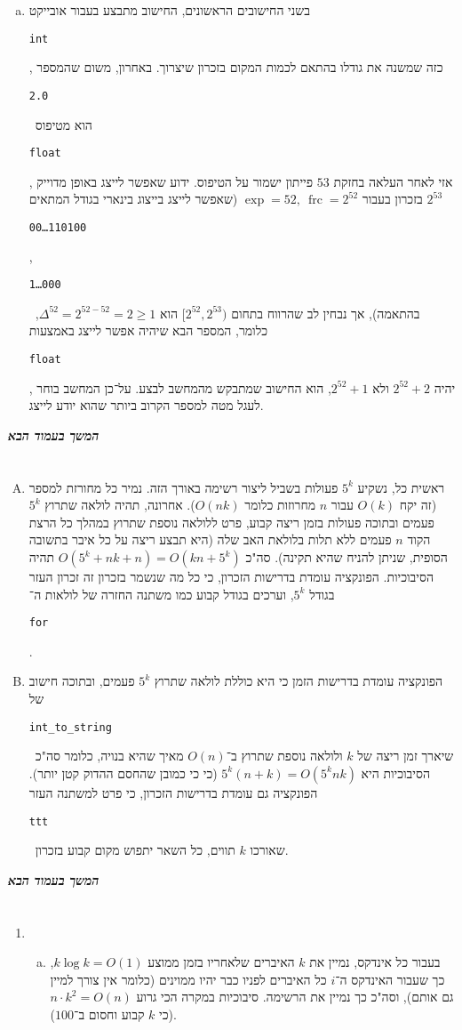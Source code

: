 \documentclass[]{article}
\makeatletter
\newcommand\en[1] {\begin{otherlanguage}{english}#1\end{otherlanguage}}
\newcommand\ttt[1]{\en{\footnotesize\texttt{#1}\normalsize}}
\newcommand\npage {\vfil {\hfil \textbf{\textit{המשך בעמוד הבא}}} \hfil \vfil \pagebreak}
\newcommand{\skipitems}[1]{
	\addtocounter{\@enumctr}{#1}
}
\DeclareMathOperator{\frc}   {frc}
\makeatother
\begin{document}
\begin{enumerate}[A)]
\begin{enumerate}[a.]
				\item בשני החישובים הראשונים, החישוב מתבצע בעבור אובייקט \ttt{int}, כזה שמשנה את גודלו בהתאם לכמות המקום בזכרון שיצרוך. באחרון, משום שהמספר \ttt{2.0} \ הוא מטיפוס \ttt{float}, אזי לאחר העלאה בחזקת $53$ פייתון ישמור על הטיפוס. ידוע שאפשר לייצג באופן מדוייק $2^{53}$ בזכרון בעבור $\exp = 52, \ \frc = 2^{52}$ (שאפשר לייצג בייצוג בינארי בגודל המתאים \ttt{00\dots110100}, \ttt{1\dots000} \ בהתאמה), אך נבחין לב שהרווח בתחום $[2^{52}, 2^{53})$ הוא $\Delta^{52} = 2^{52 - 52} = 2 \ge 1$, כלומר, המספר הבא שיהיה אפשר לייצג באמצעות \ttt{float}, יהיה $2^{52} + 2$ ולא $2^{52} + 1$, הוא החישוב שמתבקש מהמחשב לבצע. על־כן המחשב בוחר לעגל מטה למספר הקרוב ביותר שהוא יודע לייצג. 
			\end{enumerate}
		\end{enumerate}
	
	\npage
	\section{}
	\begin{enumerate}[A.]
		\skipitems{3}
		\item ראשית כל, נשקיע $5^k$ פעולות בשביל ליצור רשימה באורך הזה. נמיר כל מחורזת למספר (זה יקח $O(k)$ עבור $n$ מחרוזות כלומר $O(nk)$). אחרונה, תהיה לולאה שתרוץ $5^k$ פעמים ובתוכה פעולות בזמן ריצה קבוע, פרט ללולאה נוספת שתרוץ במהלך כל הרצת הקוד $n$ פעמים ללא תלות בלולאת האב שלה (היא תבצע ריצה על כל איבר בתשובה הסופית, שניתן להניח שהיא תקינה). סה"כ $O(5^k + nk + n) = O(kn + 5^k)$ תהיה הסיבוכיות. הפונקציה עומדת בדרישות הזכרון, כי כל מה שנשמר בזכרון זה זכרון העזר בגודל $5^k$, וערכים בגודל קבוע כמו משתנה החזרה של לולאות ה־\ttt{for}. 
		\skipitems{1}
		\item הפונקציה עומדת בדרישות הזמן כי היא כוללת לולאה שתרוץ $5^k$ פעמים, ובתוכה חישוב של \ttt{int\_to\_string} \ שיארך זמן ריצה של $k$ ולולאה נוספת שתרוץ ב־$O(n)$ מאיך שהיא בנויה, כלומר סה"כ הסיבוכיות היא $5^k(n + k) = O(5^knk)$ (כי כי כמובן שהחסם ההדוק קטן יותר). הפונקציה גם עומדת בדרישות הזכרון, כי פרט למשתנה העזר \ttt{ttt} \ שאורכו $k$ תווים, כל השאר יתפוש מקום קבוע בזכרון. 
	\end{enumerate}
	\npage
	\section{}
	\begin{enumerate}
		\skipitems{1}
		\item \begin{enumerate}[a.]
			\skipitems{1}
			\item בעבור כל אינדקס, נמיין את $k$ האיברים שלאחריו בזמן ממוצע $k\log k = O(1)$, כך שעבור האינדקס ה־$i$ כל האיברים לפניו כבר יהיו ממוינים (כלומר אין צורך למיין גם אותם), וסה"כ כך נמיין את הרשימה. סיבוכיות במקרה הכי גרוע $n \cdot k^2 = O(n)$ (כי $k$ קבוע וחסום ב־$100$). 
		\end{enumerate}
	\end{enumerate}
\end{document}
